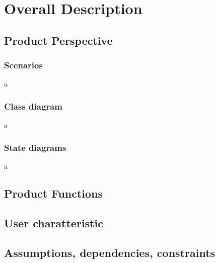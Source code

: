 \chapter{Overall Description}

\section{Product Perspective}
\subsection{Scenarios}
a

\subsection{Class diagram}
a

\subsection{State diagrams}
a

\section{Product Functions}
\section{User charatteristic}
\section{Assumptions, dependencies, constraints}